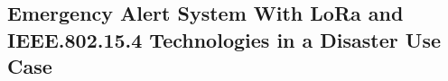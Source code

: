 \begin{refsection}
\chapter[21]{Emergency Alert System With LoRa and IEEE.802.15.4 Technologies in a Disaster Use Case} %
\printbib
\end{refsection}

